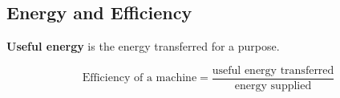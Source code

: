 \subsection{Energy and Efficiency}

\textbf{Useful energy} is the energy transferred for a purpose.

$$\text{Efficiency of a machine}=\frac{\text{useful energy transferred}}{\text{energy supplied}}$$
